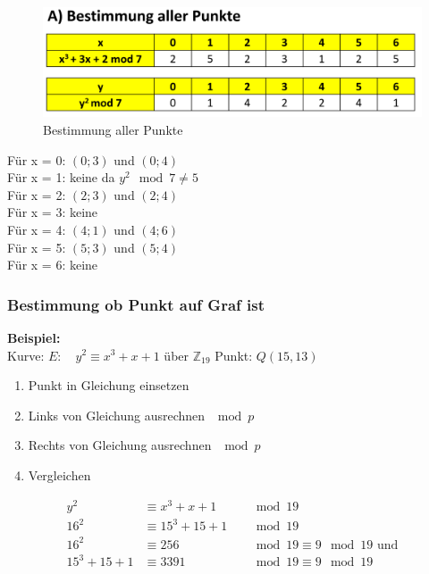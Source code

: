 \documentclass[12pt]{scrartcl}
\begin{document}
\begin{figure}[ht]
    \centering
    \includegraphics[width=\textwidth]{img/bestimung_aller_punkte.png}
    \caption{Bestimmung aller Punkte}
    \label{fig:bestimmung_aller_punkte}
\end{figure}

Für x = 0: $(0; 3)$ und $(0; 4)$ \\
Für x = 1: keine da $y^2 \mod 7 \neq 5$ \\
Für x = 2: $(2; 3)$ und $(2; 4)$ \\
Für x = 3: keine \\
Für x = 4: $(4; 1)$ und $(4; 6)$ \\
Für x = 5: $(5; 3)$ und $(5; 4)$ \\
Für x = 6: keine \\




\subsubsection{Bestimmung ob Punkt auf Graf ist}

\textbf{Beispiel:}\\

Kurve: $E: \quad y^2 \equiv x^3 + x + 1$ über $\mathbb{Z}_{19}$
Punkt: $Q(15, 13)$

\begin{enumerate}
    \item Punkt in Gleichung einsetzen
    \item Links von Gleichung ausrechnen $\mod p$
    \item Rechts von Gleichung ausrechnen $\mod p$
    \item Vergleichen
\end{enumerate}

\begin{align}
    y^2 &\equiv x^3 + x + 1 &&\mod 19 \\
    16^2 &\equiv 15^3 + 15 + 1 &&\mod 19 \\
    16^2 &\equiv 256 &&\mod 19 \equiv 9 \mod 19 \text{ und} \\
    15^3 + 15 + 1 &\equiv 3391 &&\mod 19 \equiv 9 \mod 19
\end{align}
\end{document}
